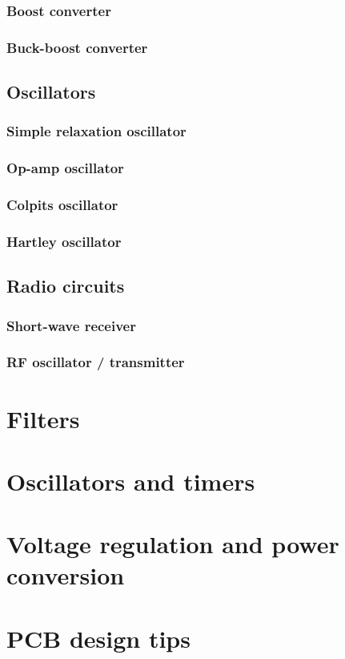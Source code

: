 \documentclass{report}
\begin{document}
\subsection{Boost converter}
\subsection{Buck-boost converter}
\section{Oscillators}
\subsection{Simple relaxation oscillator}
\subsection{Op-amp oscillator}
\subsection{Colpits oscillator}
\subsection{Hartley oscillator}
\section{Radio circuits}
\subsection{Short-wave receiver}
\subsection{RF oscillator / transmitter}

\chapter{Filters}
\chapter{Oscillators and timers}
\chapter{Voltage regulation and power conversion}
\chapter{PCB design tips}
\end{document}
